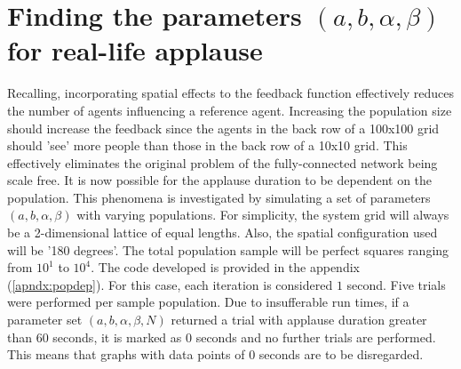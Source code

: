 \section{Finding the parameters $(a,b,\alpha,\beta)$ for real-life applause}

\hspace{\parindent}Recalling, incorporating spatial effects to the feedback function effectively reduces the number of agents influencing a reference agent. Increasing the population size should increase the feedback since the agents in the back row of a 100x100 grid should 'see' more people than those in the back row of a 10x10 grid. 
This effectively eliminates the original problem of the fully-connected network being scale free.
It is now possible for the applause duration to be dependent on the population.
This phenomena is investigated by simulating a set of parameters $(a,b,\alpha,\beta)$ with varying populations.
For simplicity, the system grid will always be a 2-dimensional lattice of equal lengths.
Also, the spatial configuration used will be '180 degrees'.
The total population sample will be perfect squares ranging from $10^1$ to $10^4$.
The code developed is provided in the appendix (\ref{apndx:popdep}).
For this case, each iteration is considered  $1$ second.
Five trials were performed per sample population.
Due to insufferable run times, if a parameter set $(a,b,\alpha,\beta,N)$ returned a trial with applause duration greater than $60$ seconds, it is marked as $0$ seconds and no further trials are performed.
This means that graphs with data points of $0$ seconds are to be disregarded.

